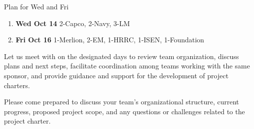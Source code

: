 \documentclass[aspectratio=43,10pt]{beamer}
\begin{document}
\begin{frame}{Plan for Wed and Fri}
\begin{enumerate}
\item \textbf{Wed Oct 14} 2-Capco, 2-Navy, 3-LM
\item \textbf{Fri Oct 16} 1-Merlion, 2-EM, 1-HRRC, 1-ISEN, 1-Foundation
\end{enumerate}

\medskip
Let us meet with on the designated days to review team organization, discuss plans and next steps, facilitate coordination among teams working with the same sponsor, and provide guidance and support for the development of project charters.

Please come prepared to discuss your team's organizational structure, current progress, proposed project scope, and any questions or challenges related to the project charter.
\end{frame}
\end{document}
